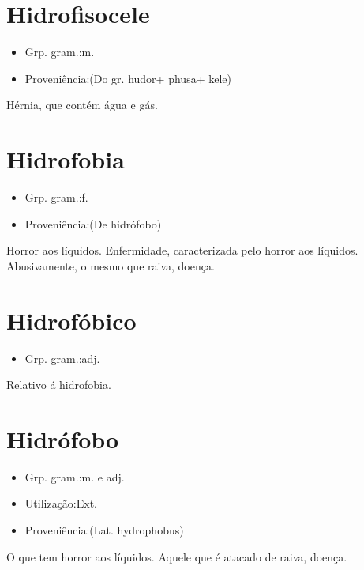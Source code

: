 \documentclass{article}
\begin{document}
\section{Hidrofisocele}
\begin{itemize}
\item {Grp. gram.:m.}
\end{itemize}
\begin{itemize}
\item {Proveniência:(Do gr. \textunderscore hudor\textunderscore  + \textunderscore phusa\textunderscore  + \textunderscore kele\textunderscore )}
\end{itemize}
Hérnia, que contém água e gás.
\section{Hidrofobia}
\begin{itemize}
\item {Grp. gram.:f.}
\end{itemize}
\begin{itemize}
\item {Proveniência:(De \textunderscore hidrófobo\textunderscore )}
\end{itemize}
Horror aos líquidos.
Enfermidade, caracterizada pelo horror aos líquidos.
Abusivamente, o mesmo que \textunderscore raiva\textunderscore , doença.
\section{Hidrofóbico}
\begin{itemize}
\item {Grp. gram.:adj.}
\end{itemize}
Relativo á hidrofobia.
\section{Hidrófobo}
\begin{itemize}
\item {Grp. gram.:m.  e  adj.}
\end{itemize}
\begin{itemize}
\item {Utilização:Ext.}
\end{itemize}
\begin{itemize}
\item {Proveniência:(Lat. \textunderscore hydrophobus\textunderscore )}
\end{itemize}
O que tem horror aos líquidos.
Aquele que é atacado de raiva, doença.
\end{document}

